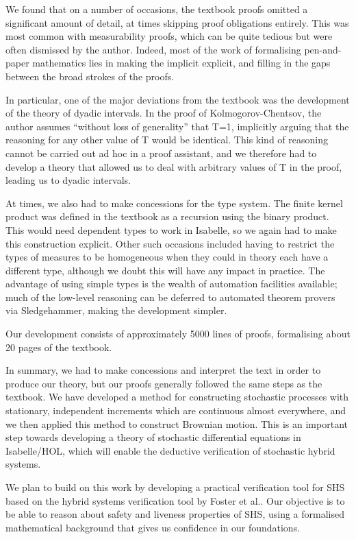 \documentclass[orivec, envcountsame]{llncs}
\begin{document}
We found that on a number of occasions, the textbook proofs omitted a significant amount of detail, at times skipping proof obligations entirely. This was most common with measurability proofs, which can be quite tedious but were often dismissed by the author. Indeed, most of the work of formalising pen-and-paper mathematics lies in making the implicit explicit, and filling in the gaps between the broad strokes of the proofs.

In particular, one of the major deviations from the textbook was the development of the theory of dyadic intervals. In the proof of Kolmogorov-Chentsov, the author assumes ``without loss of generality'' that T=1, implicitly arguing that the reasoning for any other value of T would be identical. This kind of reasoning cannot be carried out ad hoc in a proof assistant, and we therefore had to develop a theory that allowed us to deal with arbitrary values of T in the proof, leading us to dyadic intervals.

At times, we also had to make concessions for the type system. The finite kernel product was defined in the textbook as a recursion using the binary product. This would need dependent types to work in Isabelle, so we again had to make this construction explicit. Other such occasions included having to restrict the types of measures to be homogeneous when they could in theory each have a different type, although we doubt this will have any impact in practice. The advantage of using simple types is the wealth of automation facilities available; much of the low-level reasoning can be deferred to automated theorem provers via Sledgehammer, making the development simpler.

Our development consists of approximately 5000 lines of proofs, formalising about 20 pages of the textbook.

In summary, we had to make concessions and interpret the text in order to produce our theory, but our proofs generally followed the same steps as the textbook. We have developed a method for constructing stochastic processes with stationary, independent increments which are continuous almost everywhere, and we then applied this method to construct Brownian motion. This is an important step towards developing a theory of stochastic differential equations in Isabelle/HOL, which will enable the deductive verification of stochastic hybrid systems.

 We plan to build on this work by developing a practical verification tool for SHS based on the hybrid systems verification tool by Foster et al.\cite{foster21}. Our objective is to be able to reason about safety and liveness properties of SHS, using a formalised mathematical background that gives us confidence in our foundations.

\printbibliography
\end{document}
